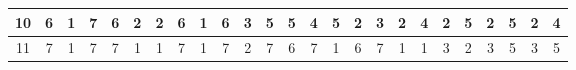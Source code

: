 \begin{sidewaystable}[]
\begin{tabular}{|c|c|c|c|c|c|c|c|c|c|c|c|c|c|c|c|c|c|c|c|c|c|c|c|c|}
    10      & 6                                               & 1                                               & 7                                               & 6                                               & 2                                               & 2                                               & 6                                               & 1                                               & 6                                               & 3                                                & 5                                                & 5                                                 &    4                                               & 5                                               & 2                                               & 3                                               & 2                                               & 4                                               & 2                                               & 5                                               & 2                                               & 5                                                & 2                                                & 4                                                \\ \hline
    11      & 7                                               & 1                                               & 7                                               & 7                                               & 1                                               & 1                                               & 7                                               & 1                                               & 7                                               & 2                                                & 7                                                & 6                                                 &    7                                               & 1                                               & 6                                               & 7                                               & 1                                               & 1                                               & 3                                               & 2                                               & 3                                               & 5                                                & 3                                                & 5                                                \\ \hline

\end{tabular}
\end{sidewaystable}
